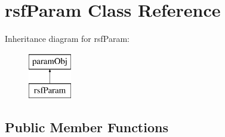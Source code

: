 \hypertarget{classrsf_param}{}\section{rsf\+Param Class Reference}
\label{classrsf_param}
Inheritance diagram for rsf\+Param\+:\begin{figure}[H]
\begin{center}
\leavevmode
\includegraphics[height=2.000000cm]{classrsf_param}
\end{center}
\end{figure}
\subsection*{Public Member Functions}
